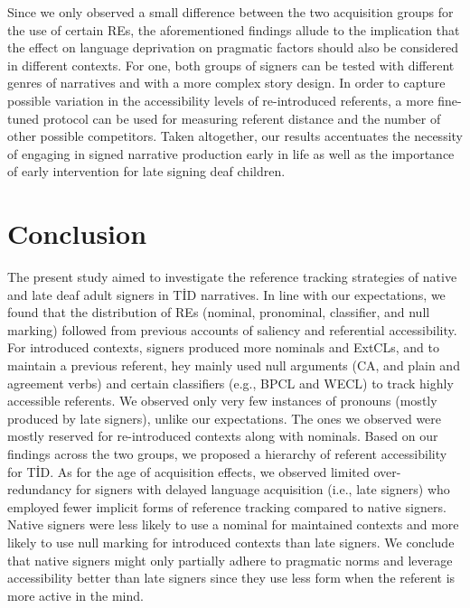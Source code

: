 \documentclass[review]{elsarticle} %
\begin{document}
Since we only observed a small difference between the two acquisition
groups for the use of certain REs, the aforementioned findings allude to
the implication that the effect on language deprivation on pragmatic
factors should also be considered in different contexts. For one, both
groups of signers can be tested with different genres of narratives and
with a more complex story design. In order to capture possible variation
in the accessibility levels of re-introduced referents, a more
fine-tuned protocol \citep[as in][]{toole1996} can be used for measuring
referent distance and the number of other possible competitors. Taken
altogether, our results accentuates the necessity of engaging in signed
narrative production early in life as well as the importance of early
intervention for late signing deaf children.

\hypertarget{conclusion}{%
\section{Conclusion}\label{conclusion}}

The present study aimed to investigate the reference tracking strategies
of native and late deaf adult signers in TİD narratives. In line with
our expectations, we found that the distribution of REs (nominal,
pronominal, classifier, and null marking) followed from previous
accounts of saliency and referential accessibility. For introduced
contexts, signers produced more nominals and ExtCLs, and to maintain a
previous referent, hey mainly used null arguments (CA, and plain and
agreement verbs) and certain classifiers (e.g., BPCL and WECL) to track
highly accessible referents. We observed only very few instances of
pronouns (mostly produced by late signers), unlike our expectations. The
ones we observed were mostly reserved for re-introduced contexts along
with nominals. Based on our findings across the two groups, we proposed
a hierarchy of referent accessibility for TİD. As for the age of
acquisition effects, we observed limited over-redundancy for signers
with delayed language acquisition (i.e., late signers) who employed
fewer implicit forms of reference tracking compared to native signers.
Native signers were less likely to use a nominal for maintained contexts
and more likely to use null marking for introduced contexts than late
signers. We conclude that native signers might only partially adhere to
pragmatic norms and leverage accessibility better than late signers
since they use less form when the referent is more active in the mind.
\end{document}
